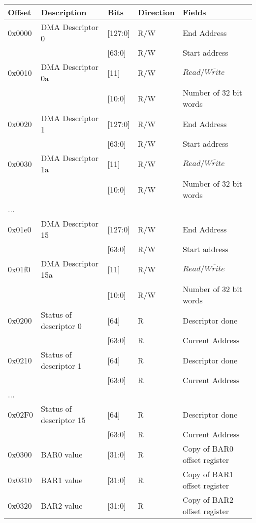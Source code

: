 \begin{table}[H]
	\centering
	\begin{tabularx}{\textwidth}{|l|X|l|l|l|}
	\hline
	\textbf{Offset} & \textbf{Description} &\textbf{Bits}&\textbf{Direction}& \textbf{Fields}\\
	\hline
	0x0000  & DMA Descriptor 0 & [127:0] & R/W & End Address\\
		& &						[63:0] & R/W & Start address\\
	\hline
	0x0010  & DMA Descriptor 0a & [11] & R/W & $Read/\overline{Write}$\\
		& &						[10:0] & R/W & Number of 32 bit words\\
	\hline
	0x0020  & DMA Descriptor 1 & [127:0] & R/W & End Address\\
		& &						[63:0] & R/W & Start address\\
	\hline
	0x0030  & DMA Descriptor 1a & [11] & R/W & $Read/\overline{Write}$\\
		& &						[10:0] & R/W & Number of 32 bit words\\
	\hline
	... & & & &\\
	\hline
	0x01e0  & DMA Descriptor 15 & [127:0] & R/W & End Address\\
		& &						[63:0] & R/W & Start address\\
	\hline
	0x01f0  & DMA Descriptor 15a & [11] & R/W & $Read/\overline{Write}$\\
		& &						[10:0] & R/W & Number of 32 bit words\\
	\hline
	0x0200 & Status of descriptor 0 & [64] & R & Descriptor done\\
			& &						[63:0] & R & Current Address\\
	\hline
	0x0210 & Status of descriptor 1 & [64] & R & Descriptor done\\
            & &                     	[63:0] & R & Current Address\\
	\hline
	... & & & &\\
	\hline	
	0x02F0 & Status of descriptor 15 & [64] & R & Descriptor done\\
			& &						[63:0] & R & Current Address\\ 		
	\hline
	0x0300  & BAR0 value & [31:0] & R & Copy of BAR0 offset register\\
	\hline
	0x0310  & BAR1 value & [31:0] & R & Copy of BAR1 offset register\\
	\hline
	0x0320  & BAR2 value & [31:0] & R & Copy of BAR2 offset register\\
	\hline
	

\end{tabularx}
\end{table}
